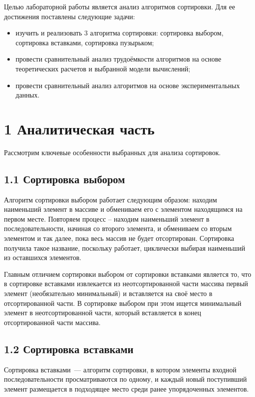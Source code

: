 \documentclass[12pt, a4paper]{report}
\begin{document}
Целью лабораторной работы является анализ алгоритмов сортировки. Для ее достижения поставлены следующие задачи:

\begin{itemize}
	\item изучить и реализовать 3 алгоритма сортировки: сортировка выбором, сортировка вставками, сортировка пузырьком;
	\item провести сравнительный анализ трудоёмкости алгоритмов на основе теоретических расчетов и выбранной модели вычислений;
	\item провести сравнительный анализ алгоритмов на основе экспериментальных данных.
\end{itemize}

\newpage
\chapter*{1 Аналитическая часть}

Рассмотрим ключевые особенности выбранных для анализа сортировок.

\section*{1.1 Сортировка выбором}
Алгоритм сортировки выбором работает следующим образом: находим наименьший элемент в массиве и обмениваем его с элементом находящимся на первом месте. Повторяем процесс
– находим наименьший элемент в последовательности, начиная со второго элемента, и обмениваем со вторым элементом и так далее, пока весь массив не будет отсортирован. Сортировка получила
такое название, поскольку работает, циклически выбирая наименьший из оставшихся элементов.

Главным отличием сортировки выбором от сортировки вставками является то, что в
сортировке вставками извлекается из неотсортированной части массива первый элемент (необязательно минимальный) и вставляется на своё место в отсортированной части. В сортировке выбором
при этом ищется минимальный элемент в неотсортированной части, который
вставляется в конец отсортированной части массива.


\section*{1.2 Сортировка вставками}
Сортировка вставками~--- алгоритм сортировки, в котором элементы входной последовательности просматриваются по одному, и каждый новый поступивший элемент размещается в подходящее место среди ранее упорядоченных элементов.
\end{document}
